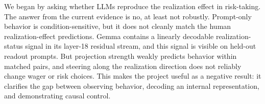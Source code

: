 \documentclass[final]{sparreport}
\begin{document}
We began by asking whether LLMs reproduce the realization effect in risk-taking. The answer from the current evidence is no, at least not robustly. Prompt-only behavior is condition-sensitive, but it does not cleanly match the human realization-effect predictions. Gemma contains a linearly decodable realization-status signal in its layer-18 residual stream, and this signal is visible on held-out readout prompts. But projection strength weakly predicts behavior within matched pairs, and steering along the realization direction does not reliably change wager or risk choices. This makes the project useful as a negative result: it clarifies the gap between observing behavior, decoding an internal representation, and demonstrating causal control.



\end{document}
